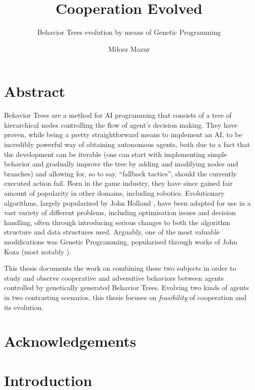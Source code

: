 \documentclass[12pt]{scrreprt}
\begin{document}
\author{Miłosz Mazur}
\title{Cooperation Evolved}
\subtitle{Behavior Trees evolution by means of Genetic Programming}
\maketitle

\newpage
\chapter*{Abstract}
Behavior Trees are a method for AI programming that consists of a tree of hierarchical nodes controlling the flow of agent's decision making. They have proven, while being a pretty straightforward means to implement an AI, to be incredibly powerful way of obtaining autonomous agents, both due to a fact that the development can be iterable (one can start with implementing simple behavior and gradually improve the tree by adding and modifying nodes and branches) and allowing for, so to say, ``fallback tactics'', should the currently executed action fail.  Born in the game industry, they have since gained fair amount of popularity in other domains, including robotics.
Evolutionary algorithms, largely popularized by John Holland \cite{hollandadaptation}, have been adapted for use in a vast variety of different problems, including optimisation issues and decision handling, often through introducing serious changes to both the algorithm structure and data structures used. Arguably, one of the most valuable modifications was Genetic Programming, popularised through works of John Koza (most notably \cite{kozagp}).

This thesis documents the work on combining these two subjects in order to study and observe cooperative and adversitive behaviors between agents controlled by genetically generated Behavior Trees. Evolving two kinds of agents in two contrasting scenarios, this thesis focuses on \textit{feasibility} of cooperation and its evolution.  %

\chapter{Acknowledgements}

\tableofcontents
\listoffigures
\listoftables
\chapter{Introduction}
\label{chapter_introduction}

\end{document}
